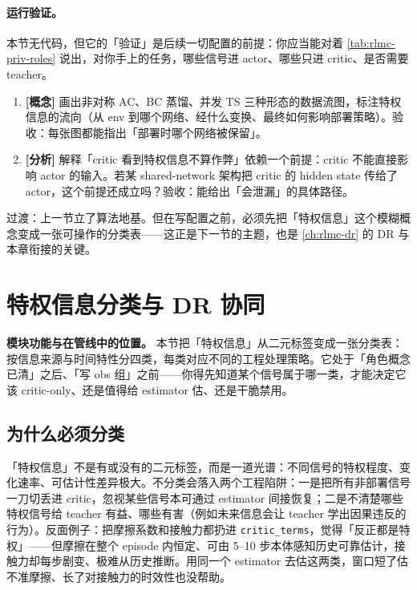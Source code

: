 \paragraph{运行验证。} 本节无代码，但它的「验证」是后续一切配置的前提：你应当能对着 \cref{tab:rlmc-priv-roles} 说出，对你手上的任务，哪些信号进 actor、哪些只进 critic、是否需要 teacher。

\begin{practice}[本节练习]
\begin{enumerate}
  \item \textbf{[概念]} 画出非对称 AC、BC 蒸馏、并发 TS 三种形态的数据流图，标注特权信息的流向（从 env 到哪个网络、经什么变换、最终如何影响部署策略）。验收：每张图都能指出「部署时哪个网络被保留」。
  \item \textbf{[分析]} 解释「critic 看到特权信息不算作弊」依赖一个前提：critic 不能直接影响 actor 的输入。若某 shared-network 架构把 critic 的 hidden state 传给了 actor，这个前提还成立吗？验收：能给出「会泄漏」的具体路径。
\end{enumerate}
\end{practice}

过渡：上一节立了算法地基。但在写配置之前，必须先把「特权信息」这个模糊概念变成一张可操作的分类表——这正是下一节的主题，也是 \cref{ch:rlmc-dr} 的 DR 与本章衔接的关键。

\section{特权信息分类与 DR 协同}
\label{sec:rlmc-priv-taxonomy}

\textbf{模块功能与在管线中的位置。} 本节把「特权信息」从二元标签变成一张分类表：按信息来源与时间特性分四类，每类对应不同的工程处理策略。它处于「角色概念已清」之后、「写 obs 组」之前——你得先知道某个信号属于哪一类，才能决定它该 critic-only、还是值得给 estimator 估、还是干脆禁用。

\subsection{为什么必须分类}
\label{sec:rlmc-priv-whyclass}

「特权信息」不是有或没有的二元标签，而是一道光谱：不同信号的特权程度、变化速率、可估计性差异极大。不分类会落入两个工程陷阱：一是把所有非部署信号一刀切丢进 critic，忽视某些信号本可通过 estimator 间接恢复；二是不清楚哪些特权信号给 teacher 有益、哪些有害（例如未来信息会让 teacher 学出因果违反的行为）。反面例子：把摩擦系数和接触力都扔进 \verb|critic_terms|，觉得「反正都是特权」——但摩擦在整个 episode 内恒定、可由 5--10 步本体感知历史可靠估计，接触力却每步剧变、极难从历史推断。用同一个 estimator 去估这两类，窗口短了估不准摩擦、长了对接触力的时效性也没帮助。

